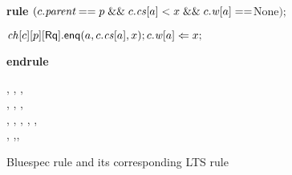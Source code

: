 \begin{figure}[t]
\centering
\begin{boxedminipage}{\columnwidth}
\small
\noindent \textbf{rule} $(c.\textit{parent} == p \; \mathit{\&\&} \; c.\mathit{cs}[a] < x \; \mathit{\&\&} \; c.\mathit{w}[a]==$None$);$

\hspace{1cm} $\mathit{ch}[c][p][\mathsf{Rq}].\mathsf{enq}(a,c.\mathit{cs}[a],x); c.\mathit{w}[a] \Leftarrow x;$

\textbf{endrule}
\end{boxedminipage}
\begin{boxedminipage}{\columnwidth}
\small
{}
{
{\dt, \ch, \s,\\ \dst, \wt, \dwt,\\ \inp, \outp}
{\dt, , \s, \dst,\\
\wt[(c,a)\coloneqq x], \dwt,\inp, \outp}{}}
\end{boxedminipage}
\caption{Bluespec rule and its corresponding LTS rule}
\label{both}
\end{figure}




